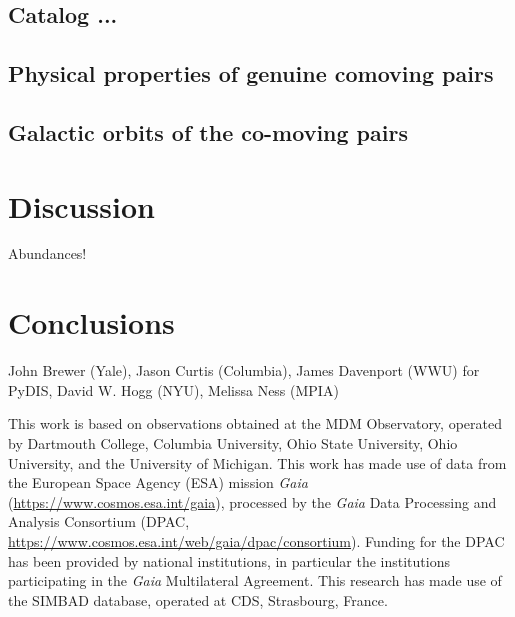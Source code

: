 \documentclass[modern, letterpaper]{aastex61}
\begin{document}
\subsection{Catalog ...}\label{sec:}



\subsection{Physical properties of genuine comoving pairs}\label{sec:}




\subsection{Galactic orbits of the co-moving pairs}\label{sec:}


\section{Discussion}

Abundances!

\section{Conclusions }

\acknowledgements
John Brewer (Yale),
Jason Curtis (Columbia),
James Davenport (WWU) for PyDIS,
David W. Hogg (NYU),
Melissa Ness (MPIA)

This work is based on observations obtained at the MDM Observatory, operated by
Dartmouth College, Columbia University, Ohio State University, Ohio University,
and the University of Michigan.
This work has made use of data from the European Space Agency (ESA)
mission {\it Gaia} (\url{https://www.cosmos.esa.int/gaia}), processed by
the {\it Gaia} Data Processing and Analysis Consortium (DPAC,
\url{https://www.cosmos.esa.int/web/gaia/dpac/consortium}). Funding
for the DPAC has been provided by national institutions, in particular
the institutions participating in the {\it Gaia} Multilateral Agreement.
This research has made use of the SIMBAD database, operated at CDS, Strasbourg,
France.
\end{document}
